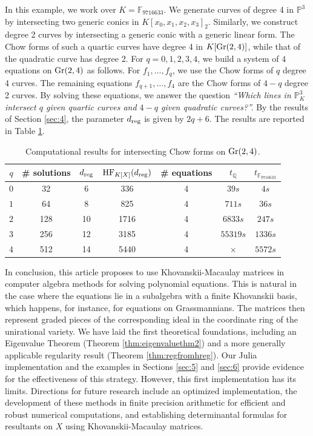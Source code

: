 \documentclass[12pt]{article}
\theoremstyle{definition}
\newenvironment{example}
  {\pushQED{\qed}\renewcommand{\qedsymbol}{$\diamond$}\examplex}
  {\popQED\endexamplex}
\theoremstyle{remark}
\begin{document}
\begin{example}[$k = 2, m = 4$]
    In this example, we work over $K = \mathbb{F}_{9716633}$. We generate curves of degree 4 in $\mathbb{P}^3$ by intersecting two generic conics in $K[x_0,x_1,x_2,x_3]_2$. Similarly, we construct degree 2 curves by intersecting a generic conic with a generic linear form. The Chow forms of such a quartic curves have degree 4 in $K[{\rm Gr}(2,4)]$, while that of the quadratic curve has degree 2. For $q = 0, 1, 2, 3, 4$, we build a system of $4$ equations on ${\rm Gr}(2,4)$ as follows. For $f_1, \ldots, f_q$, we use the Chow forms of $q$ degree 4 curves. The remaining equations $f_{q+1}, \ldots, f_4$ are the Chow forms of $4-q$ degree 2 curves. By solving these equations, we answer the question \emph{``Which lines in $\mathbb{P}_K^3$ intersect $q$ given quartic curves and $4-q$ given quadratic curves?''.} By the results of Section \ref{sec:4}, the parameter $d_{\rm reg}$ is given by $2q+6$. The results are reported in Table \ref{tab:chowforms}.
    \begin{table}[h]
    \centering
    \small
    \begin{tabular}{c|cccccc}
$q$ & \# solutions & $d_{\rm reg}$ & ${\rm HF}_{K[X]}(d_{\rm reg})$ & \# equations & 
$t_\mathbb{Q}$ & $t_{\mathbb{F}_{9716633}}$\\ \hline
$0$ & 32 & 6  & 336  & 4 & $39s$ & $4s$ \\ 
$1$  & 64  & 8 & 825   & 4 & $711s$  & $36s$  \\ 
$2$ & 128 & 10 & 1716  & 4 & $6833s$  & $247s$  \\ 
$3$ & 256 & 12 & 3185  & 4 & $55319s$ & $1336s$ \\ 
$4$ & 512 & 14 & 5440  & 4 & $\times$  &  $5572s$ \\ 
\end{tabular}
    \caption{Computational results for intersecting Chow forms on ${\rm Gr}(2,4)$.}
    \label{tab:chowforms}
\end{table}
\end{example}

In conclusion, this article proposes to use Khovanskii-Macaulay matrices in computer algebra methods for solving polynomial equations. This is natural in the case where the equations lie in a subalgebra with a finite Khovanskii basis, which happens, for instance, for equations on Grassmannians. The matrices then represent graded pieces of the corresponding ideal in the coordinate ring of the unirational variety.
We have laid the first theoretical foundations, including an Eigenvalue Theorem (Theorem \ref{thm:eigenvaluethm2}) and a more generally applicable regularity result (Theorem \ref{thm:regfromhreg}). Our Julia implementation and the examples in Sections \ref{sec:5} and \ref{sec:6} provide evidence for the effectiveness of this strategy. However, this first implementation has its limits. Directions for future research include an optimized implementation, the development of these methods in finite precision arithmetic for efficient and robust numerical computations, and establishing determinantal formulas for resultants on $X$ using Khovanskii-Macaulay matrices.
\end{document}
